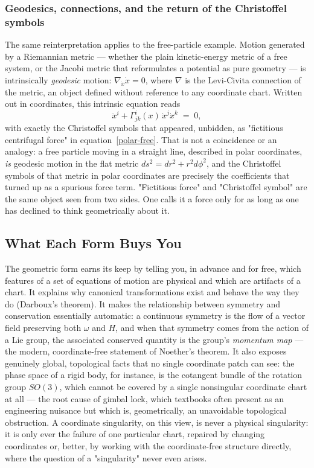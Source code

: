 \subsubsection{Geodesics, connections, and the return of the Christoffel symbols}

The same reinterpretation applies to the free-particle example. Motion
generated by a Riemannian metric --- whether the plain kinetic-energy metric of
a free system, or the Jacobi metric that reformulates a potential as pure
geometry --- is intrinsically \emph{geodesic} motion: $\nabla_{\dot x}\dot x =
0$, where $\nabla$ is the Levi-Civita connection of the metric, an object
defined without reference to any coordinate chart. Written out in coordinates,
this intrinsic equation reads
\begin{equation}
  \ddot x^i + \Gamma^i_{jk}(x)\,\dot x^j \dot x^k \;=\; 0,
  \label{geodesic-coord}
\end{equation}
with exactly the Christoffel symbols that appeared, unbidden, as
"fictitious centrifugal force" in equation~\eqref{polar-free}.
That is not a coincidence or an analogy: a free particle moving in a
straight line, described in polar coordinates, \emph{is} geodesic
motion in the flat metric $ds^2 = dr^2 + r^2 d\phi^2$, and the
Christoffel symbols of that metric in polar coordinates are precisely
the coefficients that turned up as a spurious force term. "Fictitious
force" and "Christoffel symbol" are the same object seen from two
sides. One calls it a force only for as long as one has declined to
think geometrically about it.

\subsection{What Each Form Buys You}

The geometric form earns its keep by telling you, in advance and for
free, which features of a set of equations of motion are physical
and which are artifacts of a chart. It explains why canonical
transformations exist and behave the way they do (Darboux's
theorem). It makes the relationship between symmetry and conservation
essentially automatic: a continuous symmetry is the flow of a vector
field preserving both $\omega$ and $H$, and when that symmetry comes
from the action of a Lie group, the associated conserved quantity is
the group's \emph{momentum map} --- the modern, coordinate-free
statement of Noether's theorem.
It also exposes genuinely global, topological facts that no single
coordinate patch can see: the phase space of a rigid body, for
instance, is the cotangent bundle of the rotation group $SO(3)$,
which cannot be covered by a single nonsingular coordinate chart at
all --- the root cause of gimbal lock, which textbooks often present
as an engineering nuisance but which is, geometrically, an
unavoidable topological obstruction. A coordinate singularity, on
this view, is never a physical singularity: it is only ever the
failure of one particular chart, repaired by changing coordinates or,
better, by working with the coordinate-free structure directly, where
the question of a "singularity" never even arises.


